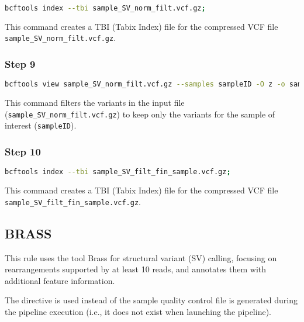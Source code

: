 \begin{lstlisting}[breaklines=true, language=bash]
    bcftools index --tbi sample_SV_norm_filt.vcf.gz;
\end{lstlisting}

This command creates a TBI (Tabix Index) file for the compressed VCF file \\ \texttt{sample\_SV\_norm\_filt.vcf.gz}.

\subsubsection*{Step 9}

\begin{lstlisting}[breaklines=true, language=bash]
    bcftools view sample_SV_norm_filt.vcf.gz --samples sampleID -O z -o sample_SV_filt_fin_sample.vcf.gz;
\end{lstlisting}

This command filters the variants in the input file (\texttt{sample\_SV\_norm\_filt.vcf.gz}) to keep only the variants for the sample of interest (\texttt{sampleID}). 

\subsubsection*{Step 10}

\begin{lstlisting}[breaklines=true, language=bash]
    bcftools index --tbi sample_SV_filt_fin_sample.vcf.gz;
\end{lstlisting}

This command creates a TBI (Tabix Index) file for the compressed VCF file\\ \texttt{sample\_SV\_filt\_fin\_sample.vcf.gz}.

\subsection{BRASS}

This rule uses the tool Brass for structural variant (SV) calling, focusing on rearrangements supported by at least 10 reads, and annotates them with additional feature information.

The  directive is used instead of  the sample quality control file is generated during the pipeline execution (i.e., it does not exist when launching the pipeline).

